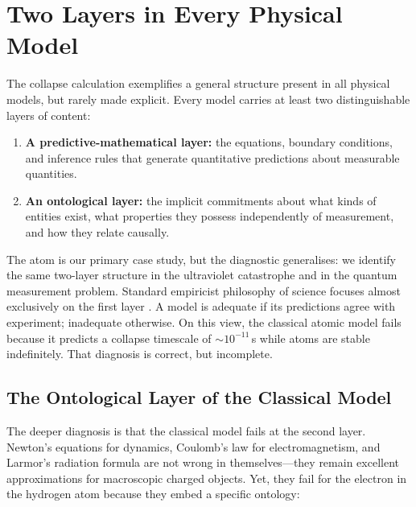 \section{Two Layers in Every Physical Model}
\label{section:layers}

The collapse calculation exemplifies a general structure present in all physical models, but rarely made explicit. Every model carries at least two distinguishable layers of content:

\begin{enumerate}
  \item \textbf{A predictive-mathematical layer:} the equations, boundary conditions, and inference rules that generate quantitative predictions about measurable quantities.
  \item \textbf{An ontological layer:} the implicit commitments about what kinds of entities exist, what properties they possess independently of measurement, and how they relate causally.
\end{enumerate}

The atom is our primary case study, but the diagnostic generalises: we identify the same two-layer structure in the ultraviolet catastrophe and in the quantum measurement problem. Standard empiricist philosophy of science focuses almost exclusively on the first layer \cite{vanfraassen_1980_image}. A model is adequate if its predictions agree with experiment; inadequate otherwise. On this view, the classical atomic model fails because it predicts a collapse timescale of $\sim10^{-11}$\,s while atoms are stable indefinitely. That diagnosis is correct, but incomplete.

\subsection{The Ontological Layer of the Classical Model}
\label{subsection:layers}

The deeper diagnosis is that the classical model fails at the second layer. Newton's equations for dynamics, Coulomb's law for electromagnetism, and Larmor's radiation formula are not wrong in themselves---they remain excellent approximations for macroscopic charged objects. Yet, they fail for the electron in the hydrogen atom because they embed a specific ontology:


